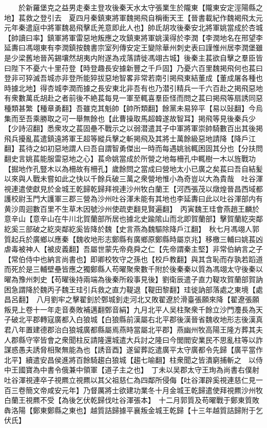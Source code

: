 　　於新羅堡克之益男走秦主登攻後秦天水太守張業生於隴東【隴東安定涇陽縣之地】萇救之登引去　夏四月秦鎮東將軍魏掲飛自稱衝天王【晉書載紀作魏褐飛太元元年秦遣庭中將軍魏曷飛擊氐羌意即此人也】帥氐胡攻後秦安北將軍姚當成於杏城【帥讀曰率】鎮軍將軍雷惡地叛應之攻鎮東將軍姚漢得於李潤【李潤地名在邢望李延夀曰馮翊東有李潤鎮按魏書宗室列傳安定王變除華州刺史表曰謹惟州居李潤堡雖是少梁舊地晉芮錫壤然胡夷内附遂為戎落請徙馮翊古城】後秦主萇欲自擊之羣臣皆曰陛下不憂六十里苻登【時登趣長安據新豐之千戶固】乃憂六百里魏掲飛何也萇曰登非可猝滅吾城亦非登所能猝拔惡地智畧非常若南引掲飛東結董成【董成屠各種也時據北地】得杏城李潤而據之長安東北非吾有也乃潜引精兵一千六百赴之掲飛惡地有衆數萬氐胡赴之者前後不絶萇每見一軍至輒喜羣臣怪而問之萇曰掲飛等扇誘同惡種類甚繁【種章勇翻】吾雖克其魁帥【帥所類翻】餘黨未易猝平【易以䜴翻】今烏集而至吾乘勝取之可一舉無餘也【此曹操取馬超韓遂故智耳】掲飛等見後秦兵少【少詩沼翻】悉衆攻之萇固壘不戰示之以弱潜遣其子中軍將軍崇帥騎數百出其後掲飛兵擾亂萇遣鎮遠將軍王超等縱兵擊之斬掲飛及其將士萬餘級惡地請降【降戶江翻】萇待之如初惡地謂人曰吾自謂智勇傑出一時而每遇姚翁輒困固其分也【分扶問翻史言姚萇能服雷惡地之心】萇命姚當成於所營之地每柵孔中輒樹一木以旌戰功【掘地作孔豎木以為柵故有柵孔】歲餘問之當成曰營地太小已廣之矣萇曰吾自結髪以來與人戰未嘗如此之快以千餘兵破三萬之衆營地惟小為奇豈以大為貴哉　吐谷渾視連遣使獻見於金城王乾歸乾歸拜視連沙州牧白蘭王【河西張茂以燉煌晉昌西域都護校尉玉門大護軍三郡三營為沙州吐谷渾未能有其地也李延夀曰此以吐谷渾部内有黄沙周迴數百里不生草木因號沙州使疏吏翻見賢遍翻】　丙寅魏王珪會燕趙王麟於意辛山【意辛山在牛川北賀蘭部所居也據北史踰隂山而北即賀蘭部】擊賀蘭紇突鄰紇奚三部破之紇突鄰紇奚皆降於魏【史言燕為魏驅除降戶江翻】　秋七月馮翊人郭質起兵於廣鄉以應秦【魏收地形志鄭縣有廣鄉原鄭縣時屬京兆】移檄三輔曰姚萇凶虐毒被神人【被皮義翻】吾屬世蒙先帝堯舜之仁【先帝謂秦主堅】非常伯納言之子【常伯侍中也納言尚書也】即卿校牧守之孫也【校戶教翻】與其含恥而存孰若蹈道而死於是三輔壁壘皆應之獨鄭縣人苟曜聚衆數千附於後秦秦以質為馮翊太守後秦以曜為豫州刺史【苟曜後持兩端為後秦所殺事見後】劉衛辰遣子直力鞮攻賀蘭部賀訥困急謂降於魏丙子魏王珪引兵救之直力鞮退【鞮田黎翻】珪徙訥部落處之東境【處昌呂翻】　八月劉牢之擊翟釗於鄄城釗走河北又敗翟遼於滑臺張願來降【翟遼張願叛見上卷十一年走音奏敗補邁翻鄄音絹】九月北平人吴柱聚衆千餘立沙門灋長為天子破北平郡轉寇廣都入白狼城【白狼縣前漢屬右北平郡後漢晉省魏收地形志後漢真君八年置建德郡治白狼城廣都縣屬焉燕時當屬北平郡】燕幽州牧高陽王隆方葬其夫人郡縣守宰皆會之衆聞柱反請隆還城遣大兵討之隆曰今閭閻安業民不思亂柱等以詐謀惑愚夫誘脅相聚無能為也【誘音酉】遂留葬訖遣廣平太守廣都令先歸【廣平當作北平】續遣安昌侯進將百餘騎趨白狼城【趨七喻翻】柱衆聞之皆潰窮捕斬之　以侍中王國寶為中書令俄兼中領軍【道子主之也】　丁未以吴郡太守王珣為尚書右僕射　吐谷渾視連卒子視羆立視羆以其父祖慈仁為四鄰所侵侮【吐谷渾辟奚視連慈仁見一百三卷簡文帝咸安元年】乃督厲將士欲建功業冬十月金城王乾歸遣使拜視羆沙州牧白蘭王視羆不受【為後乞伏乾歸伐吐谷渾張本】　十二月郭質及苟曜戰于鄭東質敗犇洛陽【鄭東鄭縣之東也】越質詰歸據平襄叛金城王乾歸【十三年越質詰歸附于乞伏氏】

